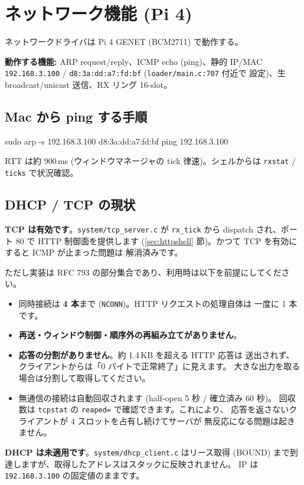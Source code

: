\documentclass[a4paper,11pt]{ltjsarticle}
\begin{document}
\section{ネットワーク機能 (Pi 4)}
ネットワークドライバは Pi 4 GENET (BCM2711) で動作する。

\textbf{動作する機能:} ARP request/reply、ICMP echo (ping)、静的 IP/MAC
\verb|192.168.3.100| / \verb|d8:3a:dd:a7:fd:bf| (\verb|loader/main.c:707| 付近で
設定)、生 broadcast/unicast 送信、RX リング 16-slot。

\subsection{Mac から ping する手順}
\begin{code}
sudo arp -s 192.168.3.100 d8:3a:dd:a7:fd:bf
ping 192.168.3.100
\end{code}
RTT は約 900\,ms (ウィンドウマネージャの tick 律速)。シェルからは \verb|rxstat| /
\verb|ticks| で状況確認。

\subsection{DHCP / TCP の現状}
\textbf{TCP は有効です}。\verb|system/tcp_server.c| が \verb|rx_tick| から
dispatch され、ポート 80 で HTTP 制御面を提供します
(\ref{sec:httpshell} 節)。かつて TCP を有効にすると ICMP が止まった問題は
解消済みです。

ただし実装は RFC 793 の部分集合であり、利用時は以下を前提にしてください。
\begin{itemize}
\item 同時接続は \textbf{4 本}まで (\verb|NCONN|)。HTTP リクエストの処理自体は
      一度に 1 本です。
\item \textbf{再送・ウィンドウ制御・順序外の再組み立てがありません}。
\item \textbf{応答の分割がありません}。約 1.4\,KB を超える HTTP 応答は
      送出されず、クライアントからは「0 バイトで正常終了」に見えます。
      大きな出力を取る場合は分割して取得してください。
\item 無通信の接続は自動回収されます (half-open 5 秒 / 確立済み 60 秒)。
      回収数は \verb|tcpstat| の \verb|reaped=| で確認できます。これにより、
      応答を返さないクライアントが 4 スロットを占有し続けてサーバが
      無反応になる問題は起きません。
\end{itemize}

\textbf{DHCP は未適用です}。\verb|system/dhcp_client.c| はリース取得
(BOUND) まで到達しますが、取得したアドレスはスタックに反映されません。
IP は \verb|192.168.3.100| の固定値のままです。
\end{document}
